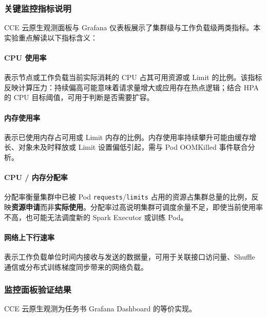 \subsubsection{关键监控指标说明}

CCE 云原生观测面板与 Grafana 仪表板展示了集群级与工作负载级两类指标。本实验重点解读以下指标含义：

\paragraph{CPU 使用率}

表示节点或工作负载当前实际消耗的 CPU 占其可用资源或 Limit 的比例。该指标反映计算压力：持续偏高可能意味着请求量增大或应用存在热点逻辑；结合 HPA 的 CPU 目标阈值，可用于判断是否需要扩容。

\paragraph{内存使用率}

表示已使用内存占可用或 Limit 内存的比例。内存使用率持续攀升可能由缓存增长、对象未及时释放或 Limit 设置偏低引起，需与 Pod OOMKilled 事件联合分析。

\paragraph{CPU / 内存分配率}

分配率衡量集群中已被 Pod \verb|requests|/\verb|limits| 占用的资源占集群总量的比例，反映\textbf{资源申请}而非\textbf{实际使用}。分配率过高说明集群可调度余量不足，即使当前使用率不高，也可能无法调度新的 Spark Executor 或训练 Pod。

\paragraph{网络上下行速率}

表示工作负载单位时间内接收与发送的数据量，可用于关联接口访问量、Shuffle 通信或分布式训练梯度同步带来的网络负载。

\subsubsection{监控面板验证结果}

CCE 云原生观测为任务书 Grafana Dashboard 的等价实现。


